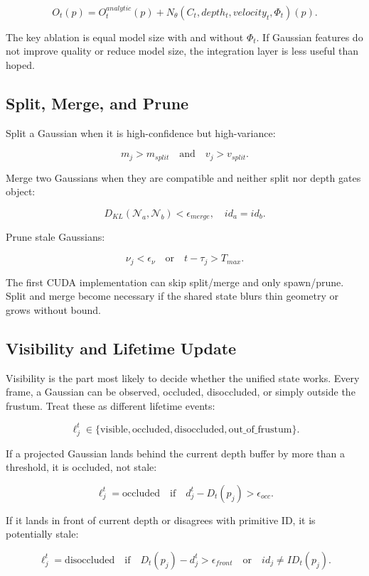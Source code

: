 \documentclass[11pt]{article}
\begin{document}
\[
  O_t(p) =
  O^{analytic}_t(p) +
  N_\theta(C_t, depth_t, velocity_t, \Phi_t)(p).
\]

The key ablation is equal model size with and without $\Phi_t$. If Gaussian
features do not improve quality or reduce model size, the integration layer is
less useful than hoped.

\subsection{Split, Merge, and Prune}

Split a Gaussian when it is high-confidence but high-variance:

\[
  m_j > m_{split}
  \quad\text{and}\quad
  v_j > v_{split}.
\]

Merge two Gaussians when they are compatible and neither split nor depth gates
object:

\[
  D_{KL}(\mathcal{N}_a,\mathcal{N}_b) < \epsilon_{merge},
  \quad id_a = id_b.
\]

Prune stale Gaussians:

\[
  \nu_j < \epsilon_\nu
  \quad\text{or}\quad
  t-\tau_j > T_{max}.
\]

The first CUDA implementation can skip split/merge and only spawn/prune. Split
and merge become necessary if the shared state blurs thin geometry or grows
without bound.

\subsection{Visibility and Lifetime Update}

Visibility is the part most likely to decide whether the unified state works.
Every frame, a Gaussian can be observed, occluded, disoccluded, or simply
outside the frustum. Treat these as different lifetime events:

\[
  \ell_j^t \in
  \{\mathrm{visible},\mathrm{occluded},\mathrm{disoccluded},
    \mathrm{out\_of\_frustum}\}.
\]

If a projected Gaussian lands behind the current depth buffer by more than a
threshold, it is occluded, not stale:

\[
  \ell_j^t=\mathrm{occluded}
  \quad\text{if}\quad
  d_j^t - D_t(p_j) > \epsilon_{occ}.
\]

If it lands in front of current depth or disagrees with primitive ID, it is
potentially stale:

\[
  \ell_j^t=\mathrm{disoccluded}
  \quad\text{if}\quad
  D_t(p_j)-d_j^t > \epsilon_{front}
  \quad\text{or}\quad
  id_j \neq ID_t(p_j).
\]
\end{document}
